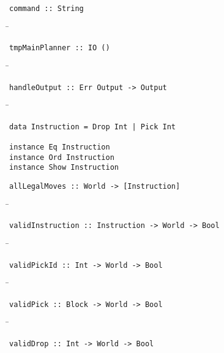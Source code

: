\begin{verbatim}
command :: String
\end{verbatim}
\begin{tabbing}
\hspace*{1cm}\= \kill
\> 
\end{tabbing}
\begin{verbatim}
tmpMainPlanner :: IO ()
\end{verbatim}
\begin{tabbing}
\hspace*{1cm}\= \kill
\> 
\end{tabbing}
\begin{verbatim}
handleOutput :: Err Output -> Output
\end{verbatim}
\begin{tabbing}
\hspace*{1cm}\= \kill
\> 
\end{tabbing}
\begin{verbatim}
data Instruction = Drop Int | Pick Int

instance Eq Instruction
instance Ord Instruction
instance Show Instruction
\end{verbatim}
\begin{verbatim}
allLegalMoves :: World -> [Instruction]
\end{verbatim}
\begin{tabbing}
\hspace*{1cm}\= \kill
\> 
\end{tabbing}
\begin{verbatim}
validInstruction :: Instruction -> World -> Bool
\end{verbatim}
\begin{tabbing}
\hspace*{1cm}\= \kill
\> 
\end{tabbing}
\begin{verbatim}
validPickId :: Int -> World -> Bool
\end{verbatim}
\begin{tabbing}
\hspace*{1cm}\= \kill
\> 
\end{tabbing}
\begin{verbatim}
validPick :: Block -> World -> Bool
\end{verbatim}
\begin{tabbing}
\hspace*{1cm}\= \kill
\> 
\end{tabbing}
\begin{verbatim}
validDrop :: Int -> World -> Bool
\end{verbatim}
